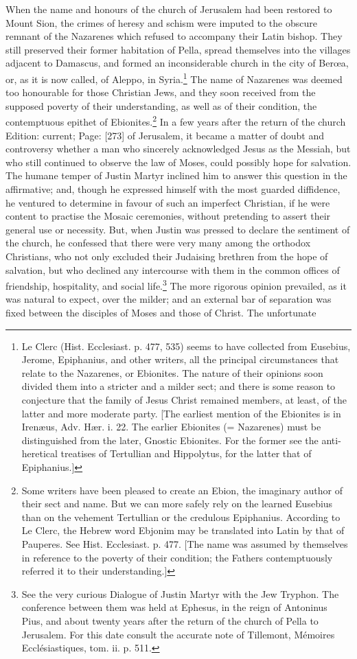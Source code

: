 When the name and honours of the church of Jerusalem had been restored to Mount Sion, the crimes of heresy and schism were imputed to the obscure remnant of the Nazarenes which refused to accompany their Latin bishop. They still preserved their former habitation of Pella, spread themselves into the villages adjacent to Damascus, and formed an inconsiderable church in the city of Berœa, or, as it is now called, of Aleppo, in Syria.\footnote{Le Clerc (Hist. Ecclesiast. p. 477, 535) seems to have collected from Eusebius, Jerome, Epiphanius, and other writers, all the principal circumstances that relate to the Nazarenes, or Ebionites. The nature of their opinions soon divided them into a stricter and a milder sect; and there is some reason to conjecture that the family of Jesus Christ remained members, at least, of the latter and more moderate party. [The earliest mention of the Ebionites is in Irenæus, Adv. Hær. i. 22. The earlier Ebionites (= Nazarenes) must be distinguished from the later, Gnostic Ebionites. For the former see the anti-heretical treatises of Tertullian and Hippolytus, for the latter that of Epiphanius.]} The name of Nazarenes was deemed too honourable for those Christian Jews, and they soon received from the supposed poverty of their understanding, as well as of their condition, the contemptuous epithet of Ebionites.\footnote{Some writers have been pleased to create an Ebion, the imaginary author of their sect and name. But we can more safely rely on the learned Eusebius than on the vehement Tertullian or the credulous Epiphanius. According to Le Clerc, the Hebrew word Ebjonim may be translated into Latin by that of Pauperes. See Hist. Ecclesiast. p. 477. [The name was assumed by themselves in reference to the poverty of their condition; the Fathers contemptuously referred it to their understanding.]} In a few years after the return of the church Edition: current; Page: [273] of Jerusalem, it became a matter of doubt and controversy whether a man who sincerely acknowledged Jesus as the Messiah, but who still continued to observe the law of Moses, could possibly hope for salvation. The humane temper of Justin Martyr inclined him to answer this question in the affirmative; and, though he expressed himself with the most guarded diffidence, he ventured to determine in favour of such an imperfect Christian, if he were content to practise the Mosaic ceremonies, without pretending to assert their general use or necessity. But, when Justin was pressed to declare the sentiment of the church, he confessed that there were very many among the orthodox Christians, who not only excluded their Judaising brethren from the hope of salvation, but who declined any intercourse with them in the common offices of friendship, hospitality, and social life.\footnote{See the very curious Dialogue of Justin Martyr with the Jew Tryphon. The conference between them was held at Ephesus, in the reign of Antoninus Pius, and about twenty years after the return of the church of Pella to Jerusalem. For this date consult the accurate note of Tillemont, Mémoires Ecclésiastiques, tom. ii. p. 511.} The more rigorous opinion prevailed, as it was natural to expect, over the milder; and an external bar of separation was fixed between the disciples of Moses and those of Christ. The unfortunate 